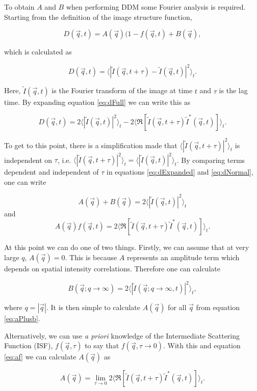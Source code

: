 \documentclass{article}
\begin{document}
	To obtain $A$ and $B$ when performing DDM some Fourier analysis is required. Starting from the definition of the image structure function, 
	
	\begin{equation}
		\label{eq:dNormal}
		D(\vec{q}, t) = A(\vec{q})(1-f(\vec{q}, t) + B(\vec{q}),
	\end{equation}

	which is calculated as
	
	\begin{equation}
		\label{eq:dFull}
		D(\vec{q}, t) = \langle|\tilde{I}(\vec{q}, t + \tau) - \tilde{I}(\vec{q}, t)|^2\rangle_t.
	\end{equation}

	Here, $\tilde{I}(\vec{q}, t)$ is the Fourier transform of the image at time $t$ and $\tau$ is the lag time. By expanding equation \ref{eq:dFull} we can write this as
	
	\begin{equation}
		\label{eq:dExpanded}
		D(\vec{q}, t) = 2\langle|\tilde{I}(\vec{q}, t)|^2\rangle_t - 2\langle\Re[\tilde{I}(\vec{q}, t+ \tau)\tilde{I}^\ast(\vec{q}, t)]\rangle_t.
	\end{equation}

	To get to this point, there is a simplification made that $\langle|\tilde{I}(\vec{q}, t+\tau)|^2\rangle_t$ is independent on $\tau$, i.e. $\langle|\tilde{I}(\vec{q}, t+\tau)|^2\rangle_t = \langle|\tilde{I}(\vec{q}, t)|^2\rangle_t$. By comparing terms dependent and independent of $\tau$ in equations \ref{eq:dExpanded} and \ref{eq:dNormal}, one can write

	\begin{equation}
		\label{eq:aPlusb}
		A(\vec{q}) + B(\vec{q}) = 2\langle|\tilde{I}(\vec{q}, t)|^2\rangle_t
	\end{equation}
	and
	\begin{equation}
		\label{eq:af}
		A(\vec{q})f(\vec{q}, t) = 2\langle\Re[\tilde{I}(\vec{q}, t+ \tau)\tilde{I}^\ast(\vec{q}, t)]\rangle_t.
	\end{equation}

	At this point we can do one of two things. Firstly, we can assume that at very large $q$, $A(\vec{q}) = 0$. This is because $A$ represents an amplitude term which depends on spatial intensity correlations. Therefore one can calculate
	
	\begin{equation}
		B(\vec{q}; q \to \infty) = 2\langle|\tilde{I}(\vec{q}; q \to \infty, t)|^2\rangle_t,
	\end{equation}
	
	where $q = |\vec{q}|$. It is then simple to calculate $A(\vec{q})$ for all $\vec{q}$ from equation \ref{eq:aPlusb}.

	Alternatively, we can use \emph{a priori} knowledge of the Intermediate Scattering Function (ISF), $f(\vec{q}, \tau)$ to say that $f(\vec{q}, \tau \to 0)$. With this and equation \ref{eq:af} we can calculate $A(\vec{q})$ as
	
	\begin{equation}
		A(\vec{q}) = \lim_{\tau\to 0}2\langle\Re[\tilde{I}(\vec{q}, t+ \tau)\tilde{I}^\ast(\vec{q}, t)]\rangle_t.
	\end{equation}
	
	
\end{document}
